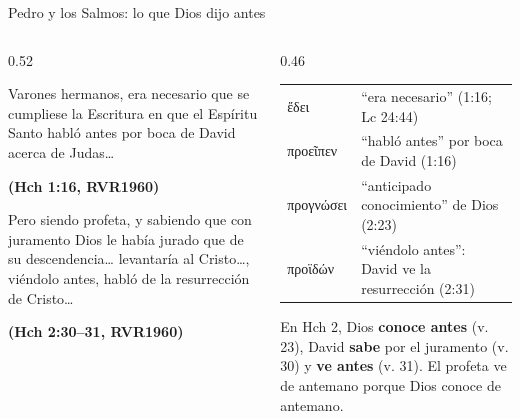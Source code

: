\documentclass[hyperref={bookmarks=false},aspectratio=169]{beamer}
\newcommand{\grc}[1]{\foreignlanguage{ancientgreek}{#1}}
\newcommand{\fuente}[1]{\par\hfill{\upshape\bfseries\footnotesize\textcolor{azul}{#1}}}
\newcommand{\destacar}[1]{\textbf{\textcolor{azul}{#1}}}
\begin{document}
\begin{frame}{Pedro y los Salmos: lo que Dios dijo antes}
\begin{columns}[t,onlytextwidth]
\begin{column}{0.52\textwidth}
\begin{cita}Varones hermanos, era necesario que se cumpliese la Escritura en que el Espíritu Santo habló antes por boca de David acerca de Judas\ldots\fuente{(Hch 1:16, RVR1960)}\end{cita}
\begin{cita}Pero siendo profeta, y sabiendo que con juramento Dios le había jurado que de su descendencia\ldots{} levantaría al Cristo\ldots, viéndolo antes, habló de la resurrección de Cristo\ldots\fuente{(Hch 2:30--31, RVR1960)}\end{cita}
\end{column}
\begin{column}{0.46\textwidth}\scriptsize
\renewcommand{\arraystretch}{1.1}
\begin{tabular}{@{}>{\RaggedRight\arraybackslash}p{1.5cm}>{\RaggedRight\arraybackslash}p{3.8cm}@{}}
\toprule
\grc{ἔδει} & ``era necesario'' (1:16; Lc 24:44) \\
\grc{προεῖπεν} & ``habló antes'' por boca de David (1:16) \\
\grc{προγνώσει} & ``anticipado conocimiento'' de Dios (2:23) \\
\grc{προϊδών} & ``viéndolo antes'': David ve la resurrección (2:31) \\
\bottomrule
\end{tabular}\par\smallskip
\small En Hch 2, Dios \destacar{conoce antes} (v. 23), David \destacar{sabe} por el juramento (v. 30) y \destacar{ve antes} (v. 31). El profeta ve de antemano porque Dios conoce de antemano.
\end{column}
\end{columns}
\end{frame}
\end{document}
